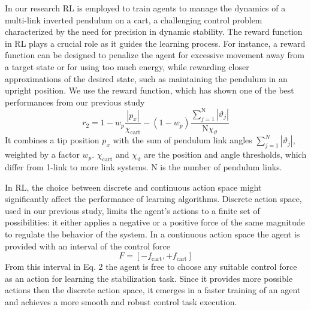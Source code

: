 In our research RL is employed to train agents to manage the dynamics of a multi-link inverted pendulum on a cart, a challenging control problem characterized by the need for precision in dynamic stability. The reward function in RL plays a crucial role as it guides the learning process. For instance, a reward function can be designed to penalize the agent for excessive movement away from a target state or for using too much energy, while rewarding closer approximations of the desired state, such as maintaining the pendulum in an upright position. We use the reward function, which has shown one of the best performances from our previous study
\begin{equation}
r_2 = 1 - w_p \frac{\left|p_x\right|}{\chi_\mathrm{cart}} - (1-w_p) \frac{\sum_{j=1}^\mathrm{N} \left|\vartheta_j\right|}{\mathrm{N} \chi_{\vartheta}} \label{eq:reward2}
\end{equation}
It combines a tip position $p_x$ with the sum of pendulum link angles $\sum_{j=1}^{N} \left|\vartheta_j\right|$, weighted by a factor $w_p$. $\chi_\mathrm{cart}$ and $\chi_{\vartheta}$ are the position and angle thresholds, which differ from 1-link to more link systems. $\mathrm{N}$ is the number of pendulum links.

In RL, the choice between discrete and continuous action space might significantly affect the performance of learning algorithms. Discrete action space, used in our previous study, limits the agent’s actions to a finite set of possibilities: it either applies a negative or a positive force of the same magnitude to regulate the behavior of the system. In a continuous action space the agent is provided with an interval of the control force
\begin{equation}
F = [-f_\mathrm{cart}, +f_\mathrm{cart}]
\label{eq:force}
\end{equation}
From this interval in Eq. 2 the agent is free to choose any suitable control force as an action for learning the stabilization task. Since it provides more possible actions then the discrete action space, it emerges in a faster training of an agent and achieves a more smooth and robust control task execution.  

